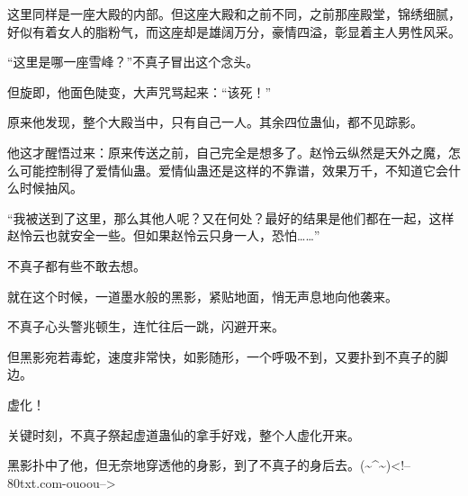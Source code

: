 \begin{this_body}
这里同样是一座大殿的内部。但这座大殿和之前不同，之前那座殿堂，锦绣细腻，好似有着女人的脂粉气，而这座却是雄阔万分，豪情四溢，彰显着主人男性风采。

“这里是哪一座雪峰？”不真子冒出这个念头。

但旋即，他面色陡变，大声咒骂起来：“该死！”

原来他发现，整个大殿当中，只有自己一人。其余四位蛊仙，都不见踪影。

他这才醒悟过来：原来传送之前，自己完全是想多了。赵怜云纵然是天外之魔，怎么可能控制得了爱情仙蛊。爱情仙蛊还是这样的不靠谱，效果万千，不知道它会什么时候抽风。

“我被送到了这里，那么其他人呢？又在何处？最好的结果是他们都在一起，这样赵怜云也就安全一些。但如果赵怜云只身一人，恐怕……”

不真子都有些不敢去想。

就在这个时候，一道墨水般的黑影，紧贴地面，悄无声息地向他袭来。

不真子心头警兆顿生，连忙往后一跳，闪避开来。

但黑影宛若毒蛇，速度非常快，如影随形，一个呼吸不到，又要扑到不真子的脚边。

虚化！

关键时刻，不真子祭起虚道蛊仙的拿手好戏，整个人虚化开来。

黑影扑中了他，但无奈地穿透他的身影，到了不真子的身后去。(\~{}\^{}\~{})<!--80txt.com-ouoou-->

\end{this_body}

